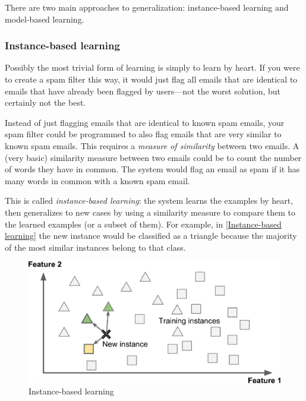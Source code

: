 There are two main approaches to generalization: instance-based learning and
model-based learning.

\subsubsection{Instance-based learning}
Possibly the most trivial form of learning is simply to learn by heart. If you were to
create a spam filter this way, it would just flag all emails that are identical to emails
that have already been flagged by users—not the worst solution, but certainly not the
best.

Instead of just flagging emails that are identical to known spam emails, your spam
filter could be programmed to also flag emails that are very similar to known spam
emails. This requires a \emph{measure of similarity} between two emails. A (very basic) similarity measure between two emails could be to count the number of words they have
in common. The system would flag an email as spam if it has many words in common with a known spam email.

This is called \emph{instance-based learning}: the system learns the examples by heart, then
generalizes to new cases by using a similarity measure to compare them to the
learned examples (or a subset of them). For example, in \autoref{Instance-based learning} the new instance
would be classified as a triangle because the majority of the most similar instances
belong to that class.
\begin{figure}
\centering
\includegraphics{img/Instance-based learning.png}
\caption{Instance-based learning}
\label{Instance-based learning}
\end{figure}

